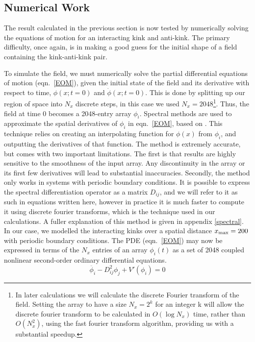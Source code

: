 \documentclass[11pt, oneside]{article}  	%
\numberwithin{equation}{section}
\begin{document}
\subsection{Numerical Work} \label{kink_kink_comp}
The result calculated in the previous section is now tested by numerically solving the equations of motion for an interacting kink and anti-kink. The primary difficulty, once again, is in making a good guess for the initial shape of a field containing the kink-anti-kink pair.\par
To simulate the field, we must numerically solve the partial differential equations of motion (eqn.~\ref{EOM}), given the initial state of the field and its derivative with respect to time, $\phi(x;t=0)$ and $\dot{\phi}(x;t=0)$. This is done by splitting up our region of space into $N_x$ discrete steps, in this case we used $N_x = 2048$\footnote{In later calculations we will calculate the discrete Fourier transform of the field. Setting the array to have a size $N_x = 2^k$ for an integer k will allow the discrete fourier transform to be calculated in $O(\log N_x)$ time, rather than $O(N_x^2)$, using the fast fourier transform algorithm, providing us with a substantial speedup.}. Thus, the field at time 0 becomes a 2048-entry array $\phi_i$. Spectral methods are used to approximate the spatial derivatives of $\phi_i$ in eqn.~\ref{EOM}, based on \cite{spectral}. This technique relies on creating an interpolating function for $\phi(x)$ from $\phi_i$, and outputting the derivatives of that function. The method is extremely accurate, but comes with two important limitations. The first is that results are highly sensitive to the smoothness of the input array. Any discontinuity in the array or its first few derivatives will lead to substantial inaccuracies. Secondly, the method only works in systems with periodic boundary conditions. It is possible to express the spectral differentiation operator as a matrix $D_{ij}$, and we will refer to it as such in equations written here, however in practice it is much faster to compute it using discrete fourier transforms, which is the technique used in our calculations. A fuller explanation of this method is given in appendix \ref{spectral}. In our case, we modelled the interacting kinks over a spatial distance $x_\textup{max} = 200$ with periodic boundary conditions. The PDE (eqn.~\ref{EOM}) may now be expressed in terms of the $N_x$ entries of an array $\phi_i(t)$ as a set of 2048 coupled nonlinear second-order ordinary differential equations.
\begin{equation}
\ddot{\phi_i} - D^2_{ij}\phi_j + V'(\phi_i) = 0
\end{equation}
\end{document}
